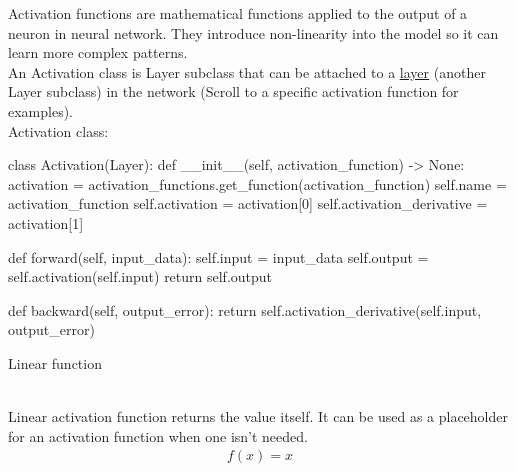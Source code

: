 \documentclass{article}
\begin{document}
    Activation functions are mathematical functions applied to
    the output of a neuron in neural network. They introduce non-linearity into 
    the model so it can learn more complex patterns. \\

    An Activation class is Layer subclass that can be attached to a \hyperlink{layers}{\underline{layer}} 
    (another Layer subclass) in the network (Scroll to a specific activation function for examples). \\

    Activation class:
    \begin{python}
class Activation(Layer):
    def __init__(self, activation_function) -> None:
        activation = activation_functions.get_function(activation_function)
        self.name = activation_function
        self.activation = activation[0]
        self.activation_derivative = activation[1]

    def forward(self, input_data):
        self.input = input_data
        self.output = self.activation(self.input)
        return self.output

    def backward(self, output_error):
        return self.activation_derivative(self.input, output_error)
    \end{python}
    \pagebreak

    \hypertarget{linear}{Linear function} \\

    Linear activation function returns the value itself. It can be 
    used as a placeholder for an activation function when one isn't 
    needed. \\

    \begin{align*}
        f(x) = x
    \end{align*}
    \begin{center}
    \end{center}
\end{document}
